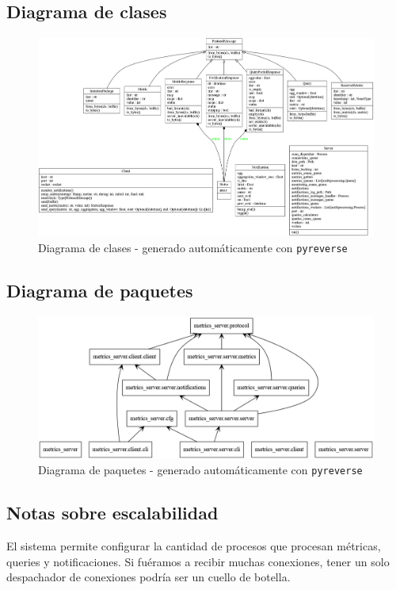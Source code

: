 \documentclass[titlepage,a4paper,oneside]{article}
\begin{document}
\subsection{Diagrama de clases}
\begin{figure}[H]
\centering
\includegraphics[width=\textwidth]{images/classes.png}
\caption{Diagrama de clases - generado automáticamente con \texttt{pyreverse}}
\end{figure}

\subsection{Diagrama de paquetes}
\begin{figure}[H]
\centering
\includegraphics[width=\textwidth]{images/packages.png}
\caption{Diagrama de paquetes - generado automáticamente con \texttt{pyreverse}}
\end{figure}

\subsection{Notas sobre escalabilidad}
El sistema permite configurar la cantidad de procesos que procesan métricas, queries y notificaciones. Si fuéramos a recibir muchas conexiones, tener un solo despachador de conexiones podría ser un cuello de botella.
\end{document}
